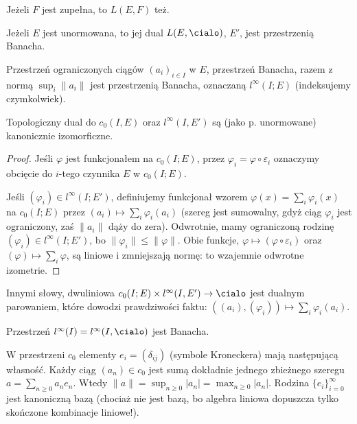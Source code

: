 \begin{fakt}
	Jeżeli $F$ jest zupełna, to $L(E, F)$ też.
\end{fakt}

\begin{wniosek}
	Jeżeli $E$ jest unormowana, to jej dual $L(E, \cialo)$, $E'$, jest przestrzenią Banacha.
\end{wniosek}

Przestrzeń ograniczonych ciągów $(a_i)_{i \in I}$ w $E$, przestrzeń Banacha, razem z normą $\sup_i \|a_i\|$ jest przestrzenią Banacha, oznaczaną $l^\infty(I; E)$ (indeksujemy czymkolwiek).

\begin{fakt}
	Topologiczny dual do $c_0(I, E)$ oraz $l^\infty(I, E')$ są (jako p. unormowane) kanonicznie izomorficzne.
\end{fakt}

\begin{proof}
	Jeśli $\varphi$ jest funkcjonałem na $c_0(I; E)$, przez $\varphi_i = \varphi \circ \varepsilon_i$ oznaczymy obcięcie do $i$-tego czynnika $E$ w $c_0(I; E)$.
	
	Jeśli $(\varphi_i) \in l^\infty (I; E')$, definiujemy funkcjonał wzorem $\varphi(x) = \sum_i \varphi_i(x)$ na $c_0(I; E)$ przez $(a_i) \mapsto \sum_i \varphi_i (a_i)$ (szereg jest sumowalny, gdyż ciąg $\varphi_i$ jest ograniczony, zaś $\|a_i\|$ dąży do zera).
	Odwrotnie, mamy ograniczoną rodzinę $(\varphi_i) \in l^\infty(I; E')$, bo $\|\varphi_i\| \le \|\varphi\|$.
	Obie funkcje, $\varphi \mapsto (\varphi \circ \varepsilon_i)$ oraz $(\varphi) \mapsto \sum_i \varphi$, są liniowe i zmniejszają normę: to wzajemnie odwrotne izometrie.
\end{proof}

Innymi słowy, dwuliniowa $c_0(I; E) \times l^\infty(I, E') \to \cialo$ jest dualnym parowaniem, które dowodzi prawdziwości faktu: $((a_i), (\varphi_i)) \mapsto \sum_i \varphi_i(a_i)$.

\begin{wniosek}
	Przestrzeń $l^\infty(I) = l^\infty(I, \cialo)$ jest Banacha.
\end{wniosek}

W przestrzeni $c_0$ elementy $e_i = (\delta_{ij})$ (symbole Kroneckera) mają następującą własność.
Każdy ciąg $(a_n) \in c_0$ jest sumą dokładnie jednego zbieżnego szeregu $a = \sum_{n \ge 0} a_ne_n$.
Wtedy $\|a\| = \sup_{n \ge 0} |a_n| = \max_{n \ge 0} |a_n|$.
Rodzina $\{e_i\}_{i = 0}^\infty$ jest kanoniczną bazą (chociaż nie jest bazą, bo algebra liniowa dopuszcza tylko skończone kombinacje liniowe!).

